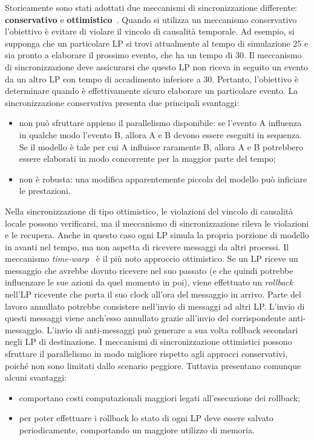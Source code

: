 \documentclass[12pt,a4paper,openright,twoside]{book}
\begin{document}
Storicamente sono stati adottati due meccanismi di sincronizzazione differente: \textbf{conservativo} e \textbf{ottimistico}~\cite{DBLP:conf/wsc/Fujimoto95}.
Quando si utilizza un meccanismo conservativo l'obiettivo è evitare di violare il vincolo di causalità temporale. Ad esempio, si supponga che un particolare LP si trovi attualmente al tempo di simulazione 25 e sia pronto a elaborare il prossimo evento, che ha un tempo di 30. Il meccanismo di sincronizzazione deve assicurarsi che questo LP non riceva in seguito un evento da un altro LP con tempo di accadimento inferiore a 30. Pertanto, l'obiettivo è determinare quando è effettivamente sicuro elaborare un particolare evento. 
La sincronizzazione conservativa presenta due principali svantaggi: 
\begin{itemize}
    \item non può sfruttare appieno il parallelismo disponibile: se l'evento A influenza in qualche modo l'evento B, allora A e B devono essere eseguiti in sequenza. Se il modello è tale per cui A influisce raramente B, allora A e B potrebbero essere elaborati in modo concorrente per la maggior parte del tempo;
    \item non è robusta: una modifica apparentemente piccola del modello può inficiare le prestazioni. 
\end{itemize}
Nella sincronizzazione di tipo ottimistico, le violazioni del vincolo di causalità locale possono verificarsi, ma il meccanismo di sincronizzazione rileva le violazioni e le recupera. Anche in questo caso ogni LP simula la propria porzione di modello in avanti nel tempo, ma non aspetta di ricevere messaggi da altri processi. 
Il meccanismo \textit{time-warp}~\cite{DBLP:journals/toplas/Jefferson85} è il più noto approccio ottimistico. Se un LP riceve un messaggio che avrebbe dovuto ricevere nel suo passato (e che quindi potrebbe influenzare le sue azioni da quel momento in poi), viene effettuato un \textit{rollback} nell'LP ricevente che porta il suo clock all'ora del messaggio in arrivo.
Parte del lavoro annullato potrebbe consistere nell'invio di messaggi ad altri LP. L'invio di questi messaggi viene anch'esso annullato grazie all'invio del corrispondente anti-messaggio. L'invio di anti-messaggi può generare a sua volta rollback secondari negli LP di destinazione.
I meccanismi di sincronizzazione ottimistici possono sfruttare il parallelismo in modo migliore rispetto agli approcci conservativi, poiché non sono limitati dallo scenario peggiore. Tuttavia presentano comunque alcuni svantaggi: 
\begin{itemize}
    \item comportano costi computazionali maggiori legati all'esecuzione dei rollback; 
    \item per poter effettuare i rollback lo stato di ogni LP deve essere salvato periodicamente, comportando un maggiore utilizzo di memoria.
\end{itemize}
\end{document}
